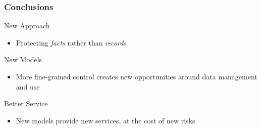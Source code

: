 \documentclass[t, 10pt]{beamer}
\begin{document}
\begin{frame}
\frametitle{Conclusions}

New Approach
\begin{itemize}
\item Protecting \textit{facts} rather than \textit{records} 
\end{itemize}

New Models
\begin{itemize}
\item More fine-grained control creates new opportunities around data management and use
\end{itemize}

Better Service
\begin{itemize}
\item New models provide new services, at the cost of new risks
\end{itemize}

\end{frame}

%
%
\end{document}
